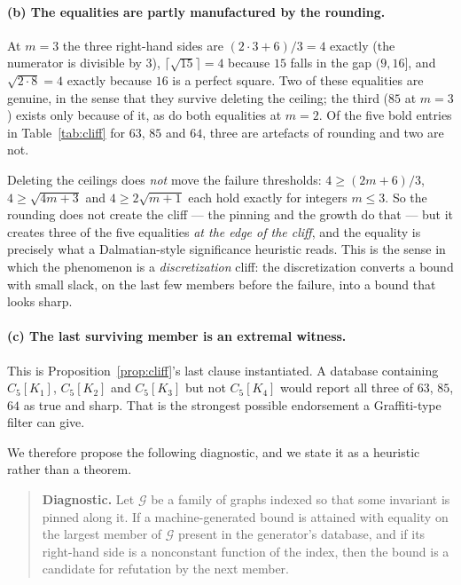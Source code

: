 \documentclass[10pt,a4paper]{article}
\theoremstyle{plain}
\theoremstyle{definition}
\newcommand{\blow}[2]{#1[K_{#2}]}
\begin{document}
\paragraph{(b) The equalities are partly manufactured by the rounding.} At $m=3$ the three
right-hand sides are $(2\cdot 3+6)/3 = 4$ exactly (the numerator is divisible by $3$),
$\lceil\sqrt{15}\rceil = 4$ because $15$ falls in the gap $(9,16]$, and $\sqrt{2\cdot 8} = 4$
exactly because $16$ is a perfect square. Two of these equalities are genuine, in the sense that
they survive deleting the ceiling; the third ($85$ at $m=3$) exists only because of it, as do
both equalities at $m = 2$. Of the five bold entries in Table~\ref{tab:cliff} for $63$, $85$ and
$64$, three are artefacts of rounding and two are not.

Deleting the ceilings does \emph{not} move the failure thresholds: $4 \ge (2m+6)/3$,
$4 \ge \sqrt{4m+3}$ and $4 \ge 2\sqrt{m+1}$ each hold exactly for integers $m \le 3$. So the
rounding does not create the cliff --- the pinning and the growth do that --- but it creates
three of the five equalities \emph{at the edge of the cliff}, and the equality is precisely what
a Dalmatian-style significance heuristic reads. This is the sense in which the phenomenon is a
\emph{discretization} cliff: the discretization converts a bound with small slack, on the last
few members before the failure, into a bound that looks sharp.

\paragraph{(c) The last surviving member is an extremal witness.} This is
Proposition~\ref{prop:cliff}'s last clause instantiated. A database containing
$\blow{C_5}{1}$, $\blow{C_5}{2}$ and $\blow{C_5}{3}$ but not $\blow{C_5}{4}$ would report all
three of $63$, $85$, $64$ as true and sharp. That is the strongest possible endorsement a
Graffiti-type filter can give.

\medskip

We therefore propose the following diagnostic, and we state it as a heuristic rather than a
theorem.

\begin{quote}
\textbf{Diagnostic.} Let $\mathcal{G}$ be a family of graphs indexed so that some invariant is
pinned along it. If a machine-generated bound is attained with equality on the largest member of
$\mathcal{G}$ present in the generator's database, and if its right-hand side is a nonconstant
function of the index, then the bound is a candidate for refutation by the next member.
\end{quote}
\end{document}
